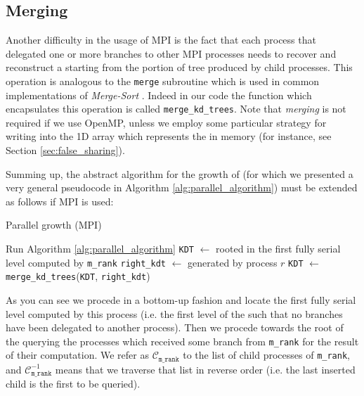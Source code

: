 \documentclass{article}
\begin{document}
\subsection{Merging}
Another difficulty in the usage of MPI is the fact that each process that
delegated one or more branches to other MPI processes needs to recover and
reconstruct a \kdtree{} starting from the portion of tree produced by child
processes. This operation is analogous to the \texttt{merge} subroutine which is
used in common implementations of \emph{Merge-Sort}
\cite{cormen2009introduction}. Indeed in our code the function which
encapsulates this operation is called \texttt{merge\_kd\_trees}. Note that
\emph{merging} is not required if we use OpenMP, unless we employ some
particular strategy for writing into the 1D array which represents the
\kdtree{} in memory (for instance, see Section \ref{sec:false_sharing}).

Summing up, the abstract algorithm for the growth of \kdtree{} (for which we
presented a very general pseudocode in Algorithm \ref{alg:parallel_algorithm})
must be extended as follows if MPI is used:

\begin{algorithm}[H]
    \SetAlgoLined
    \caption{Parallel \kdtree{} growth (MPI)}\label{alg:parallel_algorithm_mpi}
    Run Algorithm \ref*{alg:parallel_algorithm}\;
    \texttt{KDT} $\gets$ \kdtree{} rooted in the first fully serial level computed by \texttt{m\_rank}\;
        {
            \texttt{right\_kdt} $\gets$ \kdtree{} generated by process $r$\;
            \texttt{KDT} $\gets$ \texttt{merge\_kd\_trees}(\texttt{KDT}, \texttt{right\_kdt})\;
        }
\end{algorithm}

As you can see we procede in a bottom-up fashion and locate the first fully
serial level computed by this process (i.e. the first level of the \kdtree{}
such that no branches have been delegated to another process). Then we procede
towards the root of the \kdtree{} querying the processes which received some
branch from \texttt{m\_rank} for the result of their computation. We refer as
$\mathcal{C}_{\texttt{m\_rank}}$ to the list of child processes of
\texttt{m\_rank}, and $\mathcal{C}_{\texttt{m\_rank}}^{-1}$ means that we
traverse that list in reverse order (i.e. the last inserted child is the first
to be queried).
\end{document}
